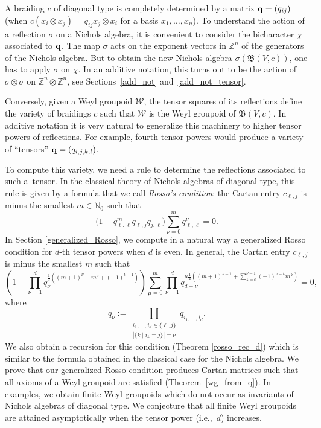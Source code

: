 \documentclass[10pt,a4paper]{amsart}
\numberwithin{equation}{section}
\newcommand{\NN }{\mathbb{N}}
\newcommand{\ZZ }{\mathbb{Z}}
\newcommand{\Wg }{\mathcal{W}}
\newcommand{\qq }{{\bf q}}
\newcommand{\BB }{\mathfrak{B}}
\newcommand{\dn }{d}
\begin{document}
A braiding $c$ of diagonal type is completely determined by a matrix $\qq=(q_{ij})$ (when $c(x_i\otimes x_j) = q_{ij} x_j\otimes x_i$ for a basis $x_1,\dots,x_n$). To understand the action of a reflection $\sigma$ on a Nichols algebra, it is convenient to consider the bicharacter $\chi$ associated to $\qq$. The map $\sigma$ acts on the exponent vectors in $\ZZ^n$ of the generators of the Nichols algebra. But to obtain the new Nichols algebra $\sigma(\BB(V,c))$, one has to apply $\sigma$ on $\chi$. In an additive notation, this turns out to be the action of $\sigma\otimes\sigma$ on $\ZZ^n\otimes \ZZ^n$, see Sections~\ref{add_not} and~\ref{add_not_tensor}.

Conversely, given a Weyl groupoid $\Wg$, the tensor squares of its reflections define the variety of braidings $c$ such that $\Wg$ is the Weyl groupoid of $\BB(V,c)$. In additive notation it is very natural to generalize this machinery to higher tensor powers of reflections.
For example, fourth tensor powers would produce a variety of ``tensors'' $\qq=(q_{i,j,k,l})$.

To compute this variety, we need a rule to determine the reflections associated to such a~tensor. In the classical theory of Nichols algebras of diagonal type, this rule is given by a formula that we call \emph{Rosso's condition}:
the Cartan entry $c_{\ell,j}$ is minus the smallest $m\in\NN_0$ such that
\begin{equation*}
\big(1-q_{\ell,\ell}^{m} q_{\ell,j}q_{j,\ell}\big) \sum_{\nu=0}^{m} q_{\ell,\ell}^\nu = 0.
\end{equation*}
In Section \ref{generalized_Rosso}, we compute in a natural way a generalized Rosso condition for $d$-th tensor powers when $d$ is even.
In general, the Cartan entry $c_{\ell,j}$ is minus the smallest $m$ such that
\begin{equation*}
\left(1-\prod_{\nu=1}^{\dn} q_\nu^{\frac{1}{2}((m+1)^{\nu}-m^{\nu}+(-1)^{\nu+1})}\right)
\sum_{\mu=0}^m \prod_{\nu=1}^d q_{\dn-\nu}^{\mu \frac{1}{2}\left( (m+1)^{\nu-1}+\sum_{k=0}^{\nu-1} (-1)^{\nu-k} m^k \right)}
= 0,
\end{equation*}
where
\[
q_\nu :=\prod_{\substack{i_1,\dots,i_\dn\in\{\ell,j\}\\ |\{k \mid i_k=j\}|=\nu}} q_{i_1,\dots,i_\dn}.
\]
We also obtain a recursion for this condition (Theorem \ref{rosso_rec_d}) which is similar to the formula obtained in the classical case for the Nichols algebra.
We prove that our generalized Rosso condition produces Cartan matrices such that all axioms of a Weyl groupoid are satisfied (Theo\-rem~\ref{wg_from_q}). In examples, we obtain finite Weyl groupoids which do not occur as invariants of Nichols algebras of diagonal type. We conjecture that all finite Weyl groupoids are attained asymptotically when the tensor power (i.e.,~$d$) increases.
\end{document}
